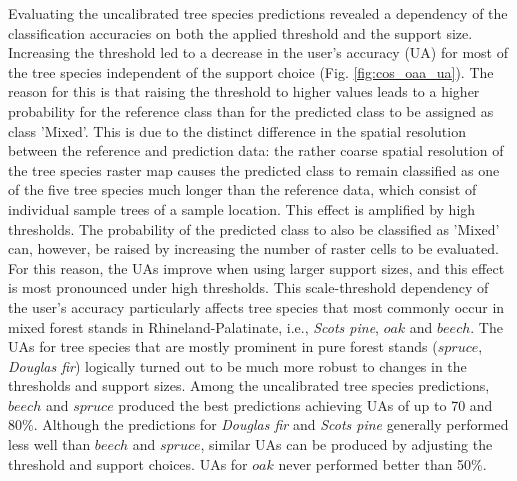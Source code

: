 Evaluating the uncalibrated tree species predictions revealed a dependency of the classification accuracies on both the applied threshold and the support size. Increasing the threshold led to a decrease in the user's accuracy (UA) for most of the tree species independent of the support choice (Fig. \ref{fig:cos_oaa_ua}). The reason for this is that raising the threshold to higher values leads to a higher probability for the reference class than for the predicted class to be assigned as class 'Mixed'. This is due to the distinct difference in the spatial resolution between the reference and prediction data: the rather coarse spatial resolution of the tree species raster map causes the predicted class to remain classified as one of the five tree species much longer than the reference data, which consist of individual sample trees of a sample location. This effect is amplified by high thresholds. The probability of the predicted class to also be classified as 'Mixed' can, however, be raised by increasing the number of raster cells to be evaluated. For this reason, the UAs improve when using larger support sizes, and this effect is most pronounced under high thresholds. This scale-threshold dependency of the user's accuracy particularly affects tree species that most commonly occur in mixed forest stands in Rhineland-Palatinate, i.e., \textit{Scots pine}, $oak$ and $beech$. The UAs for tree species that are mostly prominent in pure forest stands ($spruce$, \textit{Douglas fir}) logically turned out to be much more robust to changes in the thresholds and support sizes. Among the uncalibrated tree species predictions, $beech$ and $spruce$ produced the best predictions achieving UAs of up to 70 and 80\%.  Although the predictions for \textit{Douglas fir} and \textit{Scots pine} generally performed less well than $beech$ and $spruce$, similar UAs can be produced by adjusting the threshold and support choices. UAs for $oak$ never performed better than 50\%.

